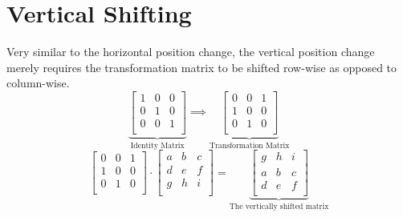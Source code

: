 \section{Vertical Shifting}

Very similar to the horizontal position change, the vertical position change
merely requires the transformation matrix to be shifted row-wise as opposed
to
column-wise.
\[
  \underbrace{
    \begin{bmatrix}
      1&0&0\\
      0&1&0\\
      0&0&1\\
    \end{bmatrix}
  }_{\text{Identity Matrix}}
  \implies
  \underbrace{
    \begin{bmatrix}
      0&0&1\\
      1&0&0\\
      0&1&0\\
    \end{bmatrix}
  }_{\text{Transformation
  Matrix}}
\]
\[ 
  \begin{bmatrix}
    0&0&1\\
    1&0&0\\
    0&1&0\\
  \end{bmatrix}
  \cdot
  \begin{bmatrix}
    a&b&c\\
    d&e&f\\
    g&h&i\\
  \end{bmatrix}
  =
  \underbrace{
    \begin{bmatrix}
    g&h&i\\
    a&b&c\\
    d&e&f\\
    \end{bmatrix}
  }_{\text{The
    vertically
    shifted
  matrix}}
\]

